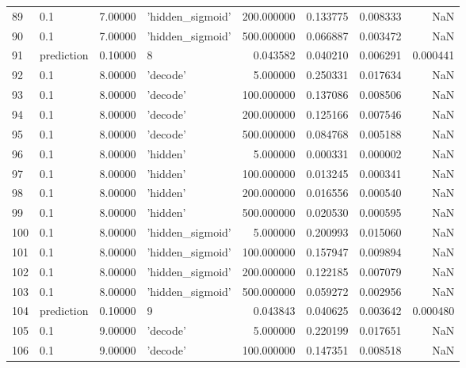 \documentclass[10pt,a4paper]{article}
\begin{document}
\begin{tabular}{llrlrrrr}
89   &         0.1 &   7.00000 &   'hidden\_sigmoid' &  200.000000 &  0.133775 &  0.008333 &       NaN \\
90   &         0.1 &   7.00000 &   'hidden\_sigmoid' &  500.000000 &  0.066887 &  0.003472 &       NaN \\
91   &  prediction &   0.10000 &                  8 &    0.043582 &  0.040210 &  0.006291 &  0.000441 \\
92   &         0.1 &   8.00000 &           'decode' &    5.000000 &  0.250331 &  0.017634 &       NaN \\
93   &         0.1 &   8.00000 &           'decode' &  100.000000 &  0.137086 &  0.008506 &       NaN \\
94   &         0.1 &   8.00000 &           'decode' &  200.000000 &  0.125166 &  0.007546 &       NaN \\
95   &         0.1 &   8.00000 &           'decode' &  500.000000 &  0.084768 &  0.005188 &       NaN \\
96   &         0.1 &   8.00000 &           'hidden' &    5.000000 &  0.000331 &  0.000002 &       NaN \\
97   &         0.1 &   8.00000 &           'hidden' &  100.000000 &  0.013245 &  0.000341 &       NaN \\
98   &         0.1 &   8.00000 &           'hidden' &  200.000000 &  0.016556 &  0.000540 &       NaN \\
99   &         0.1 &   8.00000 &           'hidden' &  500.000000 &  0.020530 &  0.000595 &       NaN \\
100  &         0.1 &   8.00000 &   'hidden\_sigmoid' &    5.000000 &  0.200993 &  0.015060 &       NaN \\
101  &         0.1 &   8.00000 &   'hidden\_sigmoid' &  100.000000 &  0.157947 &  0.009894 &       NaN \\
102  &         0.1 &   8.00000 &   'hidden\_sigmoid' &  200.000000 &  0.122185 &  0.007079 &       NaN \\
103  &         0.1 &   8.00000 &   'hidden\_sigmoid' &  500.000000 &  0.059272 &  0.002956 &       NaN \\
104  &  prediction &   0.10000 &                  9 &    0.043843 &  0.040625 &  0.003642 &  0.000480 \\
105  &         0.1 &   9.00000 &           'decode' &    5.000000 &  0.220199 &  0.017651 &       NaN \\
106  &         0.1 &   9.00000 &           'decode' &  100.000000 &  0.147351 &  0.008518 &       NaN \\

\end{tabular}
\end{document}
